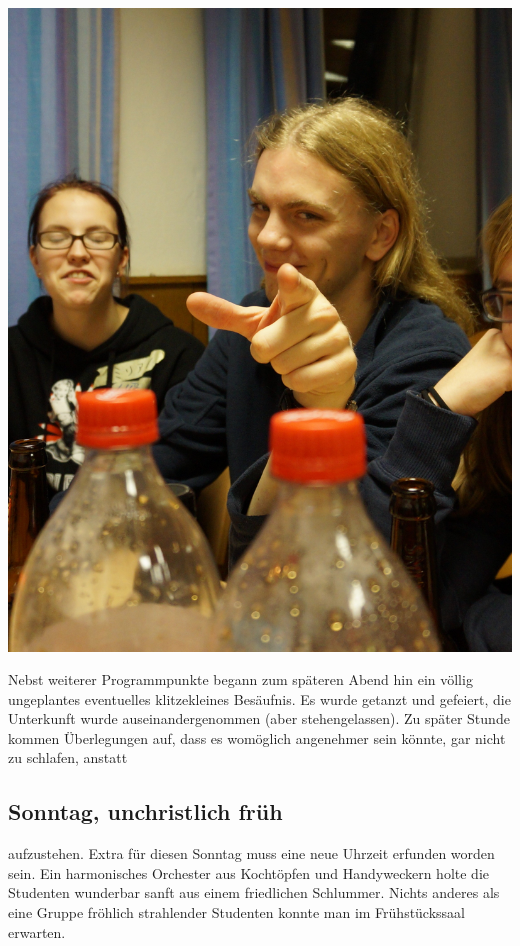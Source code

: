 \begin{multicols*}{2}
\begin{center}
	\includegraphics[width=\columnwidth, height=0.4\textheight]{res/erstiwe/valentin_finger_cropped.jpg}
\end{center}

Nebst weiterer Programmpunkte begann zum späteren Abend hin ein völlig ungeplantes eventuelles klitzekleines Besäufnis.
Es wurde getanzt und gefeiert, die Unterkunft wurde auseinandergenommen (aber stehengelassen).
Zu später Stunde kommen Überlegungen auf, dass es womöglich angenehmer sein könnte, gar nicht zu schlafen, anstatt 

\subsection{Sonntag, unchristlich früh}
aufzustehen.
Extra für diesen Sonntag muss eine neue Uhrzeit erfunden worden sein.
Ein harmonisches Orchester aus Kochtöpfen und Handyweckern holte die Studenten wunderbar sanft aus einem friedlichen Schlummer.
Nichts anderes als eine Gruppe fröhlich strahlender Studenten konnte man im Frühstückssaal erwarten.


\end{multicols*}
